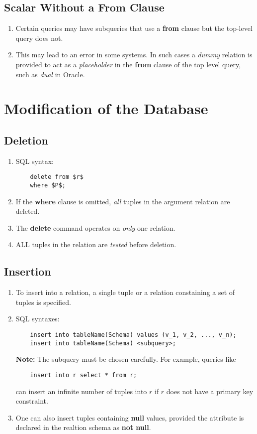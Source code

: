 \documentclass[journal,12pt,twocolumn]{IEEEtran}
\begin{document}
\subsection{Scalar Without a From Clause}
\begin{enumerate}
    \item Certain queries may have subqueries that use a \textbf{from} clause 
    but the top-level query does not.
    \item This may lead to an error in some systems. In such cases a 
    \textit{dummy} relation is provided to act as a \textit{placeholder} in 
    the \textbf{from} clause of the top level query, such as \textit{dual} in 
    Oracle.
\end{enumerate}

\section{Modification of the Database}

\subsection{Deletion}
\begin{enumerate}
    \item  SQL syntax:
    \begin{lstlisting}
    delete from $r$
    where $P$;
    \end{lstlisting}
    \item If the \textbf{where} clause is omitted, \textit{all} tuples in 
    the argument relation are deleted.
    \item The \textbf{delete} command operates on \textit{only} one 
    relation.
    \item ALL tuples in the relation are \textit{tested} before deletion.
\end{enumerate}

\subsection{Insertion}
\begin{enumerate}
    \item To insert into a relation, a single tuple or a relation constaining 
    a set of tuples is specified.
    \item SQL syntaxes:
    \begin{lstlisting}
    insert into tableName(Schema) values (v_1, v_2, ..., v_n);
    insert into tableName(Schema) <subquery>;
    \end{lstlisting}
    \textbf{Note:} The subquery must be chosen carefully. For example, queries 
    like
    \begin{lstlisting}
    insert into r select * from r;
    \end{lstlisting}
    can insert an infinite number of tuples into $r$ if $r$ does not have a primary key constraint.
    \item One can also insert tuples containing \textbf{null} values, provided 
    the attribute is declared in the realtion schema as \textbf{not null}.
\end{enumerate}
\end{document}
